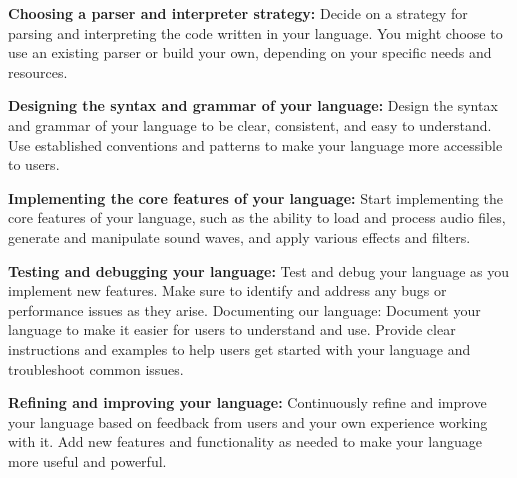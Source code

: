 \textbf {Choosing a parser and interpreter strategy:} Decide on a strategy for parsing and interpreting the code written in your language. You might choose to use an existing parser or build your own, depending on your specific needs and resources. 

\textbf {Designing the syntax and grammar of your language:} Design the syntax and grammar of your language to be clear, consistent, and easy to understand. Use established conventions and patterns to make your language more accessible to users. 

\textbf {Implementing the core features of your language:} Start implementing the core features of your language, such as the ability to load and process audio files, generate and manipulate sound waves, and apply various effects and filters.

\textbf {Testing and debugging your language:} Test and debug your language as you implement new features. Make sure to identify and address any bugs or performance issues as they arise. 
Documenting our language: Document your language to make it easier for users to understand and use. Provide clear instructions and examples to help users get started with your language and troubleshoot common issues. 

\textbf {Refining and improving your language:} Continuously refine and improve your language based on feedback from users and your own experience working with it. Add new features and functionality as needed to make your language more useful and powerful.


